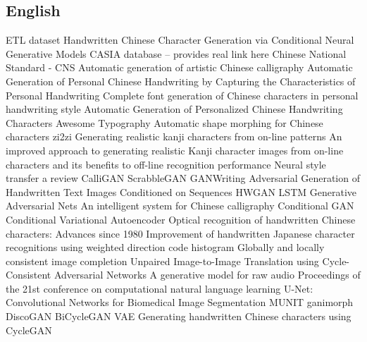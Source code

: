 \documentclass[12pt]{report}
\begin{document}
\begin{thebibliography}{9}
\section*{English}
	 ETL dataset
	 Handwritten Chinese Character Generation via Conditional Neural Generative Models
	 CASIA database – provides real link here
	 Chinese National Standard - CNS
	 Automatic generation of artistic Chinese calligraphy
	 Automatic Generation of Personal Chinese Handwriting by Capturing the Characteristics of Personal Handwriting
	 Complete font generation of Chinese characters in personal handwriting style
	 Automatic Generation of Personalized Chinese Handwriting Characters
	 Awesome Typography
	 Automatic shape morphing for Chinese characters
	 zi2zi
	 Generating realistic kanji characters from on-line patterns
	 An improved approach to generating realistic Kanji character images from on-line characters and its benefits to off-line recognition performance
	 Neural style transfer a review
	 CalliGAN
	 ScrabbleGAN
	 GANWriting
	 Adversarial Generation of Handwritten Text Images Conditioned on Sequences
	 HWGAN
	 LSTM
	 Generative Adversarial Nets
	 An intelligent system for Chinese calligraphy
	 Conditional GAN
	 Conditional Variational Autoencoder
	 Optical recognition of handwritten Chinese characters: Advances since 1980
	 Improvement of handwritten Japanese character recognitions using weighted direction code histogram
	 Globally and locally consistent image completion
	 Unpaired Image-to-Image Translation using Cycle-Consistent Adversarial Networks
	 A generative model for raw audio
	 Proceedings of the 21st conference on computational natural language learning
	 U-Net: Convolutional Networks for Biomedical Image Segmentation
	 MUNIT
	 ganimorph
	 DiscoGAN
	 BiCycleGAN
	 VAE
	 Generating handwritten Chinese characters using CycleGAN

\end{thebibliography}
\end{document}

